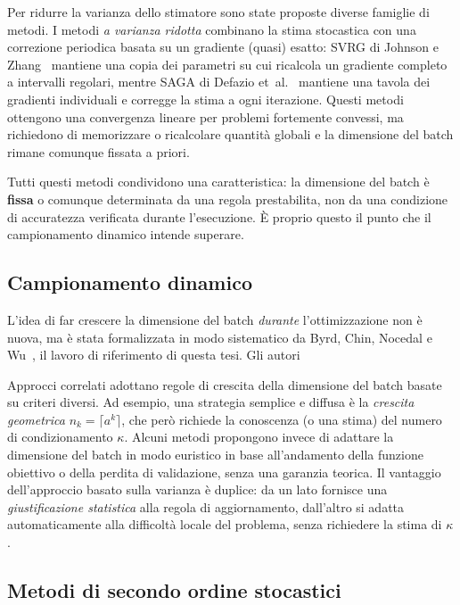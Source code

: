 \documentclass[a4paper,12pt]{article}
\numberwithin{equation}{section}
\numberwithin{figure}{section}
\numberwithin{table}{section}
\begin{document}
Per ridurre la varianza dello stimatore sono state proposte diverse famiglie di
metodi. I metodi \emph{a varianza ridotta} combinano la stima stocastica con
una correzione periodica basata su un gradiente (quasi) esatto: SVRG di Johnson
e Zhang~\cite{johnson2013} mantiene una copia dei parametri su cui ricalcola un
gradiente completo a intervalli regolari, mentre SAGA di Defazio
et~al.~\cite{defazio2014} mantiene una tavola dei gradienti individuali e
corregge la stima a ogni iterazione. Questi metodi ottengono una convergenza
lineare per problemi fortemente convessi, ma richiedono di memorizzare o
ricalcolare quantità globali e la dimensione del batch rimane comunque fissata
a priori.

Tutti questi metodi condividono una caratteristica: la dimensione del batch è
\textbf{fissa} o comunque determinata da una regola prestabilita, non da una
condizione di accuratezza verificata durante l'esecuzione. È proprio questo il
punto che il campionamento dinamico intende superare.

\subsection{Campionamento dinamico}

L'idea di far crescere la dimensione del batch \emph{durante} l'ottimizzazione
non è nuova, ma è stata formalizzata in modo sistematico da Byrd, Chin, Nocedal
e Wu~\cite{byrd2012}, il lavoro di riferimento di questa tesi. Gli autori

Approcci correlati adottano regole di crescita della dimensione del batch
basate su criteri diversi. Ad esempio, una strategia semplice e diffusa è la
\emph{crescita geometrica} $n_k = \lceil a^k \rceil$, che però richiede la
conoscenza (o una stima) del numero di condizionamento $\kappa$. Alcuni metodi
propongono invece di adattare la dimensione del batch in modo euristico in base
all'andamento della funzione obiettivo o della perdita di validazione, senza
una garanzia teorica. Il vantaggio dell'approccio basato sulla varianza è
duplice: da un lato fornisce una \emph{giustificazione statistica} alla regola
di aggiornamento, dall'altro si adatta automaticamente alla difficoltà locale
del problema, senza richiedere la stima di $\kappa$.

\subsection{Metodi di secondo ordine stocastici}
\end{document}
